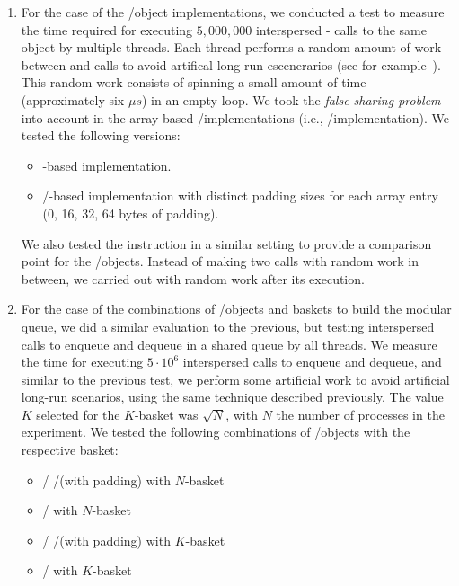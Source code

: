 \begin{enumerate}
    \item For the case of the \LL/\IC object implementations, we conducted a test to measure the time required for executing \(5,000,000\) interspersed \LL - \IC calls to the same object by multiple threads. Each thread performs a random amount of work between \LL and \IC calls to avoid artifical long-run escenerarios (see for example~\cite{DBLP_conf_ppopp_YangM16}). This random work consists of spinning a small amount of time (approximately six \(\mu{}s\)) in an empty loop. We took the \textit{false sharing problem}~\cite{BoloskyMichael93} into account in the array-based \LL/\IC implementations (i.e., \R/\W implementation). We tested the following versions:

    \begin{itemize}
        \item \CAS-based implementation.
        \item \R/\W-based implementation with distinct padding sizes for each array entry (0, 16, 32, 64 bytes of padding).
        \end{itemize}

We also tested the \FAI instruction in a similar setting to provide a comparison point for the \LL/\IC objects. Instead of making two calls with random work in between, we carried out \FAI with random work after its execution.

\item For the case of the combinations of \LL/\IC objects and baskets to build the modular queue, we did a similar evaluation to the previous, but testing interspersed calls to enqueue and dequeue in a shared queue by all threads. We measure the time for executing \(5\cdot 10^6\) interspersed calls to enqueue and dequeue, and similar to the previous test, we perform some artificial work to avoid artificial long-run scenarios, using the same technique described previously. The value \(K\) selected for the \(K\)-basket was \(\sqrt{N}\), with \(N\) the number of processes in the experiment. We tested the following combinations of \LL/\IC objects with the respective basket:
    \begin{itemize}
        \item \LL/\IC{} \R/\W (with padding) with \(N\)-basket
        \item \LL/\IC{} \CAS with \(N\)-basket
        \item \LL/\IC{} \R/\W (with padding) with \(K\)-basket
        \item \LL/\IC{} \CAS with \(K\)-basket
    \end{itemize}
  \end{enumerate}

